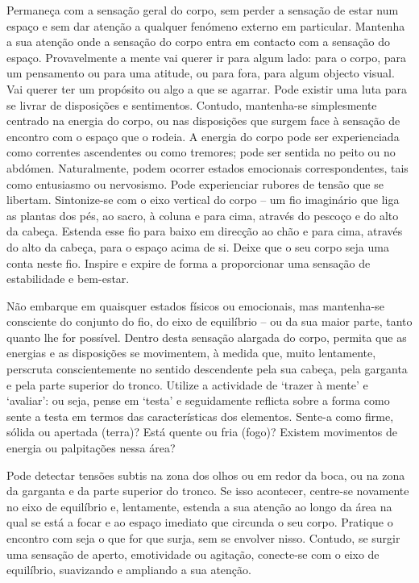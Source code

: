 Permaneça com a sensação geral do corpo, sem perder a sensação de estar num espaço e sem dar atenção a qualquer fenómeno externo em particular. Mantenha a sua atenção onde a sensação do corpo entra em contacto com a sensação do espaço. Provavelmente a mente vai querer ir para algum lado: para o corpo, para um pensamento ou para uma atitude, ou para fora, para algum objecto visual. Vai querer ter um propósito ou algo a que se agarrar. Pode existir uma luta para se livrar de disposições e sentimentos. Contudo, mantenha-se simplesmente centrado na energia do corpo, ou nas disposições que surgem face à sensação de encontro com o espaço que o rodeia. A energia do corpo pode ser experienciada como correntes ascendentes ou como tremores; pode ser sentida no peito ou no abdómen. Naturalmente, podem ocorrer estados emocionais correspondentes, tais como entusiasmo ou nervosismo. Pode experienciar rubores de tensão que se libertam. Sintonize-se com o eixo vertical do corpo -- um fio imaginário que liga as plantas dos pés, ao sacro, à coluna e para cima, através do pescoço e do alto da cabeça. Estenda esse fio para baixo em direcção ao chão e para cima, através do alto da cabeça, para o espaço acima de si. Deixe que o seu corpo seja uma conta neste fio. Inspire e expire de forma a proporcionar uma sensação de estabilidade e bem-estar.

Não embarque em quaisquer estados físicos ou emocionais, mas mantenha-se consciente do conjunto do fio, do eixo de equilíbrio -- ou da sua maior parte, tanto quanto lhe for possível. Dentro desta sensação alargada do corpo, permita que as energias e as disposições se movimentem, à medida que, muito lentamente, perscruta conscientemente no sentido descendente pela sua cabeça, pela garganta e pela parte superior do tronco. Utilize a actividade de `trazer à mente' e `avaliar': ou seja, pense em `testa' e seguidamente reflicta sobre a forma como sente a testa em termos das características dos elementos. Sente-a como firme, sólida ou apertada (terra)? Está quente ou fria (fogo)? Existem movimentos de energia ou palpitações nessa área?

Pode detectar tensões subtis na zona dos olhos ou em redor da boca, ou na zona da garganta e da parte superior do tronco. Se isso acontecer, centre-se novamente no eixo de equilíbrio e, lentamente, estenda a sua atenção ao longo da área na qual se está a focar e ao espaço imediato que circunda o seu corpo. Pratique o encontro com seja o que for que surja, sem se envolver nisso. Contudo, se surgir uma sensação de aperto, emotividade ou agitação, conecte-se com o eixo de equilíbrio, suavizando e ampliando a sua atenção.

